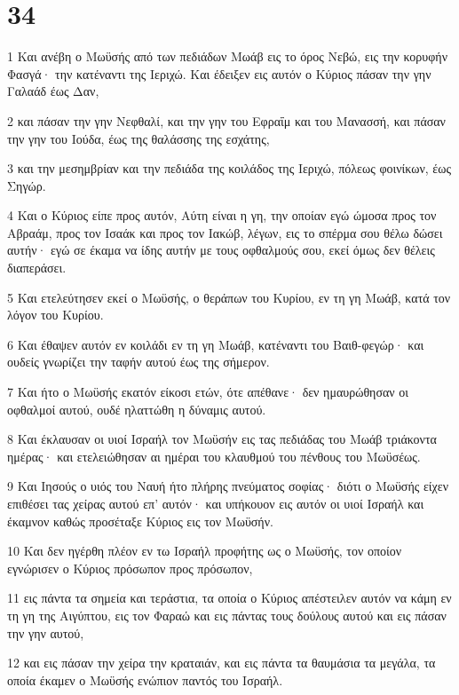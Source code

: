 \chapter{34}

\par 1 Και ανέβη ο Μωϋσής από των πεδιάδων Μωάβ εις το όρος Νεβώ, εις την κορυφήν Φασγά· την κατέναντι της Ιεριχώ. Και έδειξεν εις αυτόν ο Κύριος πάσαν την γην Γαλαάδ έως Δαν,
\par 2 και πάσαν την γην Νεφθαλί, και την γην του Εφραΐμ και του Μανασσή, και πάσαν την γην του Ιούδα, έως της θαλάσσης της εσχάτης,
\par 3 και την μεσημβρίαν και την πεδιάδα της κοιλάδος της Ιεριχώ, πόλεως φοινίκων, έως Σηγώρ.
\par 4 Και ο Κύριος είπε προς αυτόν, Αύτη είναι η γη, την οποίαν εγώ ώμοσα προς τον Αβραάμ, προς τον Ισαάκ και προς τον Ιακώβ, λέγων, εις το σπέρμα σου θέλω δώσει αυτήν· εγώ σε έκαμα να ίδης αυτήν με τους οφθαλμούς σου, εκεί όμως δεν θέλεις διαπεράσει.
\par 5 Και ετελεύτησεν εκεί ο Μωϋσής, ο θεράπων του Κυρίου, εν τη γη Μωάβ, κατά τον λόγον του Κυρίου.
\par 6 Και έθαψεν αυτόν εν κοιλάδι εν τη γη Μωάβ, κατέναντι του Βαιθ-φεγώρ· και ουδείς γνωρίζει την ταφήν αυτού έως της σήμερον.
\par 7 Και ήτο ο Μωϋσής εκατόν είκοσι ετών, ότε απέθανε· δεν ημαυρώθησαν οι οφθαλμοί αυτού, ουδέ ηλαττώθη η δύναμις αυτού.
\par 8 Και έκλαυσαν οι υιοί Ισραήλ τον Μωϋσήν εις τας πεδιάδας του Μωάβ τριάκοντα ημέρας· και ετελειώθησαν αι ημέραι του κλαυθμού του πένθους του Μωϋσέως.
\par 9 Και Ιησούς ο υιός του Ναυή ήτο πλήρης πνεύματος σοφίας· διότι ο Μωϋσής είχεν επιθέσει τας χείρας αυτού επ' αυτόν· και υπήκουον εις αυτόν οι υιοί Ισραήλ και έκαμνον καθώς προσέταξε Κύριος εις τον Μωϋσήν.
\par 10 Και δεν ηγέρθη πλέον εν τω Ισραήλ προφήτης ως ο Μωϋσής, τον οποίον εγνώρισεν ο Κύριος πρόσωπον προς πρόσωπον,
\par 11 εις πάντα τα σημεία και τεράστια, τα οποία ο Κύριος απέστειλεν αυτόν να κάμη εν τη γη της Αιγύπτου, εις τον Φαραώ και εις πάντας τους δούλους αυτού και εις πάσαν την γην αυτού,
\par 12 και εις πάσαν την χείρα την κραταιάν, και εις πάντα τα θαυμάσια τα μεγάλα, τα οποία έκαμεν ο Μωϋσής ενώπιον παντός του Ισραήλ.


